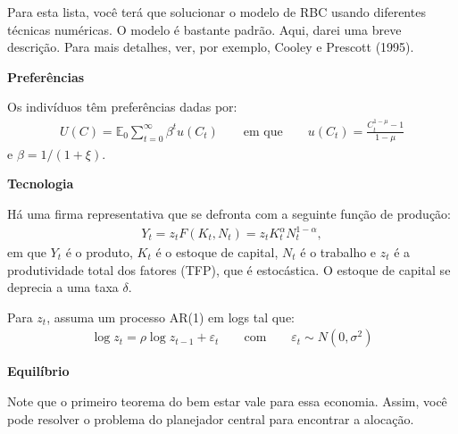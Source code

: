 \documentclass[10pt]{article}
\newcommand\E{\mathbb{E}}
\newcommand\0{\mathbf{0}}
\newcounter{exercise}
\newcounter{problem}[exercise]
\begin{document}
\newdimen\headerwidth


\begin{center}
\end{center}

Para esta lista, você terá que solucionar o modelo de RBC usando diferentes técnicas numéricas. O modelo é bastante padrão. Aqui, darei uma breve descrição. Para mais detalhes, ver, por exemplo, Cooley e Prescott (1995).

\textbf{Preferências}

Os indivíduos têm preferências dadas por: 
\begin{align*}
U(C) = \E_0 \sum_{t=0}^\infty \beta^t u(C_t) \qquad \text{em que} \qquad 
u(C_t) = \frac{C_t^{1-\mu} - 1}{1 - \mu}
\end{align*}
e $\beta = 1/(1+\xi)$.

\textbf{Tecnologia}

Há uma firma representativa que se defronta com a seguinte função de produção:
\begin{align*}
Y_t = z_t F(K_t, N_t) = z_t K_t^\alpha N_t^{1-\alpha}, 
\end{align*}
em que $Y_t$ é o produto, $K_t$ é o estoque de capital, $N_t$ é o trabalho e $z_t$ é a produtividade total dos fatores (TFP), que é estocástica. O estoque de capital se deprecia a uma taxa $\delta$. 

Para $z_t$, assuma um processo AR(1) em logs tal que:
\begin{align*}
\log z_t = \rho \log z_{t-1} + \varepsilon_t \qquad \text{com} \qquad \varepsilon_t \sim N(0, \sigma^2)
\end{align*}\vspace{-0.8cm}

\textbf{Equilíbrio}

Note que o primeiro teorema do bem estar vale para essa economia. Assim, você pode resolver o problema do planejador central para encontrar a alocação.
\end{document}
